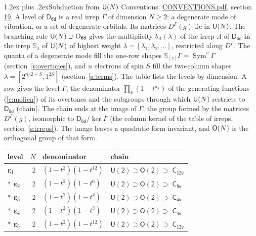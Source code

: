 \documentclass[10pt,a4paper]{article}
\makeatletter
\renewcommand\section{\@startsection{section}{1}{\z@}{-3ex plus -1ex minus -.2ex}%
  {1.2ex plus .2ex}{\normalfont\large\sffamily\bfseries\color{parttitle}}}
\numberwithin{equation}{section}
\newcommand{\grp}[1]{\mathsf{#1}}
\newcommand{\irr}[1]{\text{\normalfont\scshape #1}}
\newcommand{\repD}[1]{D^{#1}}
\newcommand{\schur}[1]{\mathbb{S}_{#1}}
\newcommand{\shape}[1]{[#1]}
\makeatother
\begin{document}
\section{Subduction from \texorpdfstring{$\grp{U(\mathnormal{N})}$}{U(N)}}\label{s:unitary}
Conventions: \href{../../CONVENTIONS.pdf}{CONVENTIONS.pdf}, section \href{../../CONVENTIONS.pdf\#conv.19}{19}.
\leavevmode\label{n:local.level.dimension}A level of $\grp{D_{6d}}$ is a real irrep $\Gamma$ of dimension $N \ge 2$: a degenerate mode of vibration, or a set of degenerate orbitals. \label{n:group.unitary}Its matrices $\repD{\Gamma}(g)$ lie in $\grp{U(\mathnormal{N})}$. \label{n:irrep.schur}\label{n:shape.partition}\label{n:local.partition}\label{n:function.multiplicity.unitary}The branching rule $\grp{U(\mathnormal{N})} \supset \grp{D_{6d}}$ gives the multiplicity $b_\Lambda(\lambda)$ of the irrep $\Lambda$ of $\grp{D_{6d}}$ in the irrep $\schur{\lambda}$ of $\grp{U(\mathnormal{N})}$ of highest weight $\lambda = \shape{\lambda_1, \lambda_2, \dots}$, restricted along $\repD{\Gamma}$. \label{n:local.partition.power}\label{n:local.electrons}\label{n:local.spin}The quanta of a degenerate mode fill the one-row shapes $\schur{\shape{v}}\Gamma = \operatorname{Sym}^{v}\Gamma$ (section~\ref{s:overtones}), and $n$ electrons of spin $S$ fill the two-column shapes $\lambda = \shape{2^{n/2-S}, 1^{2S}}$ (section~\ref{s:terms}).
The table lists the levels by dimension. \label{n:head.level}\label{n:head.denominator}\label{n:index.overtone.denominator}\label{n:head.chain}A row gives the level $\Gamma$, the denominator $\prod_k (1 - t^{a_k})$ of the generating functions (\ref{e:molien}) of its overtones and the subgroups through which $\grp{U(\mathnormal{N})}$ restricts to $\grp{D_{6d}}$ (chain). The chain ends at the image of $\Gamma$, the group formed by the matrices $\repD{\Gamma}(g)$, isomorphic to $\grp{D_{6d}}/\ker\Gamma$ (the column kernel of the table of irreps, section~\ref{s:irreps}). The image leaves a quadratic form invariant, and $\grp{O(\mathnormal{N})}$ is the orthogonal group of that form.
{\small\begin{longtable}{@{}lrll@{}}\toprule
level & $N$ & denominator & chain\\\midrule\endhead
\bottomrule\endfoot\endlastfoot
$\irr{e}_{1}$ & 2 & $(1-t^{2})(1-t^{12})$ & $\grp{U(2)} \supset \grp{O(2)} \supset$ \href{C12v.pdf}{$\grp{C_{12v}}$}\\*
$\irr{e}_{2}$ & 2 & $(1-t^{2})(1-t^{6})$ & $\grp{U(2)} \supset \grp{O(2)} \supset$ \href{C6v.pdf}{$\grp{C_{6v}}$}\\*
$\irr{e}_{3}$ & 2 & $(1-t^{2})(1-t^{4})$ & $\grp{U(2)} \supset \grp{O(2)} \supset$ \href{C4v.pdf}{$\grp{C_{4v}}$}\\*
$\irr{e}_{4}$ & 2 & $(1-t^{2})(1-t^{3})$ & $\grp{U(2)} \supset \grp{O(2)} \supset$ \href{C3v.pdf}{$\grp{C_{3v}}$}\\*
$\irr{e}_{5}$ & 2 & $(1-t^{2})(1-t^{12})$ & $\grp{U(2)} \supset \grp{O(2)} \supset$ \href{C12v.pdf}{$\grp{C_{12v}}$}\\
\bottomrule\end{longtable}}
\end{document}
